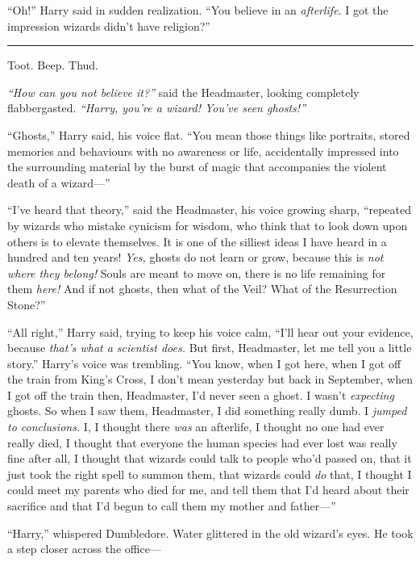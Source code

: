 ``Oh!'' Harry said in sudden realization. ``You believe in an
\emph{afterlife}. I got the impression wizards didn't have religion?''

\begin{center}\rule{3in}{0.4pt}\end{center}

Toot. Beep. Thud.

\emph{``How can you not believe it?''} said the Headmaster, looking
completely flabbergasted. \emph{``Harry, you're a wizard! You've seen
ghosts!''}

``Ghosts,'' Harry said, his voice flat. ``You mean those things like
portraits, stored memories and behaviours with no awareness or life,
accidentally impressed into the surrounding material by the burst of
magic that accompanies the violent death of a wizard---''

``I've heard that theory,'' said the Headmaster, his voice growing
sharp, ``repeated by wizards who mistake cynicism for wisdom, who think
that to look down upon others is to elevate themselves. It is one of the
silliest ideas I have heard in a hundred and ten years! \emph{Yes,}
ghosts do not learn or grow, because this is \emph{not where they
belong!} Souls are meant to move on, there is no life remaining for them
\emph{here!} And if not ghosts, then what of the Veil? What of the
Resurrection Stone?''

``All right,'' Harry said, trying to keep his voice calm, ``I'll hear
out your evidence, because \emph{that's what a scientist does.} But
first, Headmaster, let me tell you a little story.'' Harry's voice was
trembling. ``You know, when I got here, when I got off the train from
King's Cross, I don't mean yesterday but back in September, when I got
off the train then, Headmaster, I'd never seen a ghost. I wasn't
\emph{expecting} ghosts. So when I saw them, Headmaster, I did something
really dumb. I \emph{jumped to conclusions.} I, I thought there
\emph{was} an afterlife, I thought no one had ever really died, I
thought that everyone the human species had ever lost was really fine
after all, I thought that wizards could talk to people who'd passed on,
that it just took the right spell to summon them, that wizards could
\emph{do} that, I thought I could meet my parents who died for me, and
tell them that I'd heard about their sacrifice and that I'd begun to
call them my mother and father---''

``Harry,'' whispered Dumbledore. Water glittered in the old wizard's
eyes. He took a step closer across the office---

